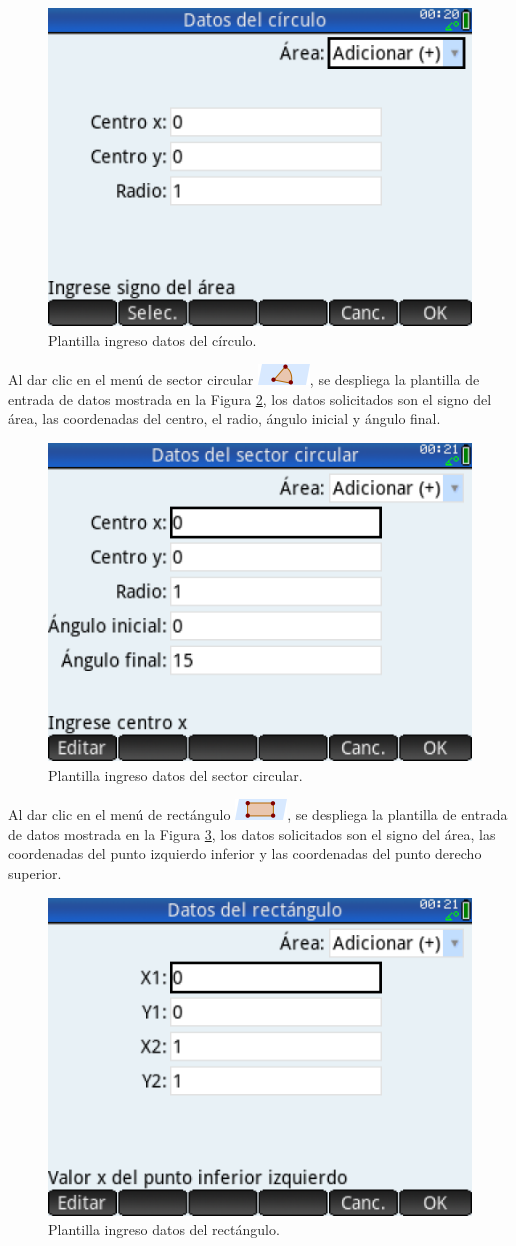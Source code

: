 \documentclass[spanish,xcolor=pdftex,dvipsnames,table,mathserif]{scrartcl}
\begin{document}
\begin{figure}[H]
	\centering
	\caption[Plantilla ingreso datos del círculo.]{Plantilla ingreso datos del círculo.}
	\label{fig:circulo}
	\includegraphics[width=0.45\linewidth]{imagenes/ingresoCirculo}
\end{figure}
Al dar clic en el menú de sector circular \includegraphics{imagenes/men_sector}, se despliega la plantilla de entrada de datos mostrada en la Figura \ref{fig:sector}, los datos solicitados son el signo del área, las coordenadas del centro, el radio, ángulo inicial y ángulo final.

\begin{figure}[H]
	\centering
	\caption[Plantilla ingreso datos del sector circular.]{Plantilla ingreso datos del sector circular.}
	\label{fig:sector}
	\includegraphics[width=0.45\linewidth]{imagenes/ingresoSectorCircular}
\end{figure}

Al dar clic en el menú de rectángulo \includegraphics{imagenes/men_rectangulo}, se despliega la plantilla de entrada de datos mostrada en la Figura \ref{fig:rectangulo}, los datos solicitados son el signo del área, las coordenadas del punto izquierdo inferior y las coordenadas del punto derecho superior.

\begin{figure}[H]
	\centering
	\caption[Plantilla ingreso datos del rectángulo.]{Plantilla ingreso datos del rectángulo.}
	\label{fig:rectangulo}
	\includegraphics[width=0.45\linewidth]{imagenes/ingresoRectangulo}
\end{figure}
\end{document}
